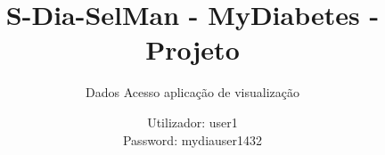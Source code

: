 \documentclass[handout]{beamer}
\title{S-Dia-SelMan - MyDiabetes - Projeto}
\subtitle{Dados Acesso aplicação de visualização}
\author{Utilizador: user1\\
Password: mydiauser1432}
\date{}
\institute{\url{mydiabetes@dcc.fc.up.pt}\\\url{http://mydiabetes.dcc.fc.up.py/}}
\begin{document}
\begin{frame}[plain,t]
\titlepage
\end{frame}
\end{document}
